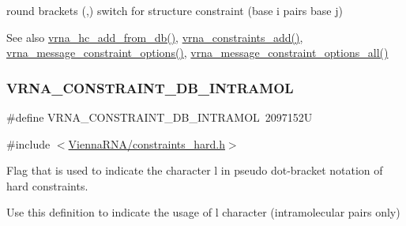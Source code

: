round brackets \textquotesingle{}(\textquotesingle{},\textquotesingle{})\textquotesingle{} switch for structure constraint (base i pairs base j) 

\begin{DoxySeeAlso}{See also}
\hyperlink{group__hard__constraints_ga5b4de3247b67358080c176b94591a8e6}{vrna\+\_\+hc\+\_\+add\+\_\+from\+\_\+db()}, \hyperlink{group__constraints_ga35a401f680969a556858a8dd5f1d07cc}{vrna\+\_\+constraints\+\_\+add()}, \hyperlink{group__constraints_gaa1f20b53bf09ac2e6b0dbb13f7d89670}{vrna\+\_\+message\+\_\+constraint\+\_\+options()}, \hyperlink{group__constraints_gaec7e13fa0465c2acc7a621d1aecb709f}{vrna\+\_\+message\+\_\+constraint\+\_\+options\+\_\+all()} 
\end{DoxySeeAlso}
\mbox{\label{group__hard__constraints_ga5c17253f5a39d1d49b0fb11f5196982a}} 
\subsubsection{\texorpdfstring{V\+R\+N\+A\+\_\+\+C\+O\+N\+S\+T\+R\+A\+I\+N\+T\+\_\+\+D\+B\+\_\+\+I\+N\+T\+R\+A\+M\+OL}{VRNA\_CONSTRAINT\_DB\_INTRAMOL}}
{\footnotesize\ttfamily \#define V\+R\+N\+A\+\_\+\+C\+O\+N\+S\+T\+R\+A\+I\+N\+T\+\_\+\+D\+B\+\_\+\+I\+N\+T\+R\+A\+M\+OL~2097152U}



{\ttfamily \#include $<$\hyperlink{constraints__hard_8h}{Vienna\+R\+N\+A/constraints\+\_\+hard.\+h}$>$}



Flag that is used to indicate the character \textquotesingle{}l\textquotesingle{} in pseudo dot-\/bracket notation of hard constraints. 

Use this definition to indicate the usage of \textquotesingle{}l\textquotesingle{} character (intramolecular pairs only)


